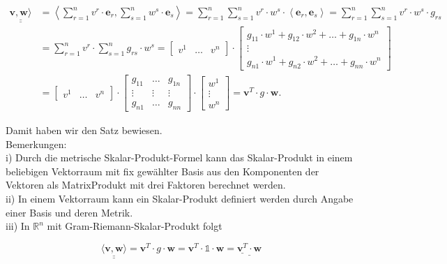 \documentclass[10pt]{article}
\begin{document}
\begin{align*}
\underline{\underline{\mathbf{v}, \mathbf{w}\rangle}} & =\left\langle\sum_{r=1}^{n} v^{r} \cdot \mathbf{e}_{r}, \sum_{s=1}^{n} w^{s} \cdot \mathbf{e}_{s}\right\rangle=\sum_{r=1}^{n} \sum_{s=1}^{n} v^{r} \cdot w^{s} \cdot\left\langle\mathbf{e}_{r}, \mathbf{e}_{s}\right\rangle=\sum_{r=1}^{n} \sum_{s=1}^{n} v^{r} \cdot w^{s} \cdot g_{r s} \\
& =\sum_{r=1}^{n} v^{r} \cdot \sum_{s=1}^{n} g_{r s} \cdot w^{s}=\left[\begin{array}{lll}
v^{1} & \ldots & v^{n}
\end{array}\right] \cdot\left[\begin{array}{c}
g_{11} \cdot w^{1}+g_{12} \cdot w^{2}+\ldots+g_{1 n} \cdot w^{n} \\
\vdots \\
g_{n 1} \cdot w^{1}+g_{n 2} \cdot w^{2}+\ldots+g_{n n} \cdot w^{n}
\end{array}\right] \\
& =\left[\begin{array}{lll}
v^{1} & \ldots & v^{n}
\end{array}\right] \cdot\left[\begin{array}{ccc}
g_{11} & \ldots & g_{1 n} \\
\vdots & \vdots & \vdots \\
g_{n 1} & \ldots & g_{n n}
\end{array}\right] \cdot\left[\begin{array}{c}
w^{1} \\
\vdots \\
w^{n}
\end{array}\right]=\mathbf{v}^{T} \cdot g \cdot \mathbf{w} . \tag{7.98}
\end{align*}


Damit haben wir den Satz bewiesen.\\
Bemerkungen:\\
i) Durch die metrische Skalar-Produkt-Formel kann das Skalar-Produkt in einem beliebigen Vektorraum mit fix gewählter Basis aus den Komponenten der Vektoren als MatrixProdukt mit drei Faktoren berechnet werden.\\
ii) In einem Vektorraum kann ein Skalar-Produkt definiert werden durch Angabe einer Basis und deren Metrik.\\
iii) In $\mathbb{R}^{n}$ mit Gram-Riemann-Skalar-Produkt folgt


\begin{equation*}
\underline{\underline{\langle\mathbf{v}, \mathbf{w}\rangle}}=\mathbf{v}^{T} \cdot g \cdot \mathbf{w}=\mathbf{v}^{T} \cdot \mathbb{1} \cdot \mathbf{w}=\underline{\underline{\mathbf{v}^{T}} \cdot \mathbf{w}} \tag{7.99}
\end{equation*}
\end{document}
